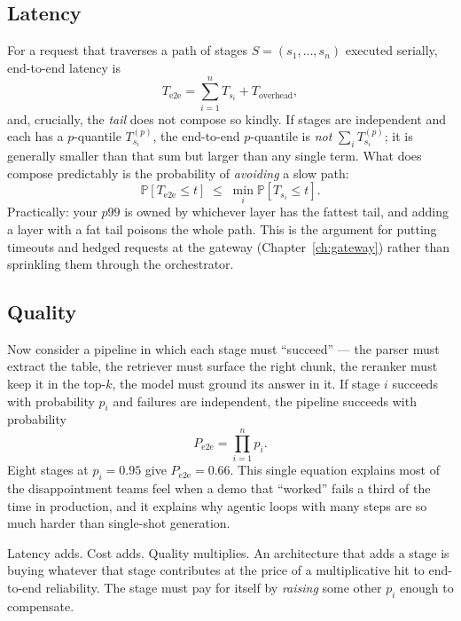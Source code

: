 \documentclass[11pt,twoside,openright]{book}
\theoremstyle{definition}
\theoremstyle{plain}
\theoremstyle{remark}
\newcommand{\Prob}{\mathbb{P}}
\begin{document}
\subsection{Latency}

For a request that traverses a path of stages $S = (s_1,\dots,s_n)$ executed
serially, end-to-end latency is
\begin{equation}
  T_{\text{e2e}} = \sum_{i=1}^{n} T_{s_i} + T_{\text{overhead}},
\label{eq:latency-sum}
\end{equation}
and, crucially, the \emph{tail} does not compose so kindly. If stages are
independent and each has a $p$-quantile $T^{(p)}_{s_i}$, the end-to-end
$p$-quantile is \emph{not} $\sum_i T^{(p)}_{s_i}$; it is generally smaller than
that sum but larger than any single term. What does compose predictably is the
probability of \emph{avoiding} a slow path:
\begin{equation}
  \Prob\!\left[T_{\text{e2e}} \le t\right] \;\le\;
  \min_i \Prob\!\left[T_{s_i} \le t\right].
\label{eq:tail-bound}
\end{equation}
Practically: your $p99$ is owned by whichever layer has the fattest tail, and
adding a layer with a fat tail poisons the whole path. This is the argument for
putting timeouts and hedged requests at the gateway (Chapter~\ref{ch:gateway})
rather than sprinkling them through the orchestrator.

\subsection{Quality}

Now consider a pipeline in which each stage must ``succeed'' --- the parser must
extract the table, the retriever must surface the right chunk, the reranker must
keep it in the top-$k$, the model must ground its answer in it. If stage $i$
succeeds with probability $p_i$ and failures are independent, the pipeline
succeeds with probability
\begin{equation}
  P_{\text{e2e}} = \prod_{i=1}^{n} p_i .
\label{eq:quality-product}
\end{equation}
Eight stages at $p_i = 0.95$ give $P_{\text{e2e}} = 0.66$. This single equation
explains most of the disappointment teams feel when a demo that ``worked'' fails
a third of the time in production, and it explains why agentic loops with many
steps are so much harder than single-shot generation.

\begin{keyidea}
Latency adds. Cost adds. Quality multiplies. An architecture that adds a stage
is buying whatever that stage contributes at the price of a multiplicative hit
to end-to-end reliability. The stage must pay for itself by \emph{raising} some
other $p_i$ enough to compensate.
\end{keyidea}
\end{document}
